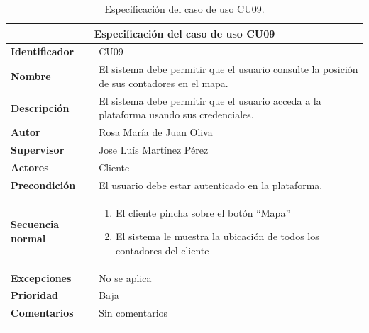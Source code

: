 \documentclass[pdftex,11pt,a4paper]{book}
\begin{document}

\renewcommand{\tablename}{Tabla}
\renewcommand{\arraystretch}{1,7}

\begin{center}
\begin{longtable}{|m{}|m{11cm}|}
\hline
\multicolumn{2}{|c|}{\textbf{Especificación del caso de uso CU09}}\\
\hline 
\endhead

\textbf{Identificador} & CU09 
\\ \hline
\textbf{Nombre} & El sistema debe permitir que el usuario consulte la posición de sus contadores en el mapa.
\\ \hline
\textbf{Descripción} & El sistema debe permitir que el usuario acceda a la plataforma usando sus credenciales.  
\\ \hline
\textbf{Autor} & Rosa María de Juan Oliva 
\\ \hline
\textbf{Supervisor} & Jose Luís Martínez Pérez  
\\ \hline
\textbf{Actores} & Cliente 
\\ \hline
\textbf{Precondición} & El usuario debe estar autenticado en la plataforma.
\\ \hline
\textbf{Secuencia normal} & 
\begin{enumerate}
\addtolength{\itemsep}{-3mm}
\item El cliente pincha sobre el botón “Mapa”
\item El sistema le muestra la ubicación de todos los contadores del cliente
\end{enumerate}
\\ \hline
\textbf{Excepciones} & No se aplica
\\ \hline
\textbf{Prioridad} & Baja  
\\ \hline
\textbf{Comentarios} & Sin comentarios
\\ \hline

\caption{Especificación del caso de uso CU09.} \label{tablalarga:tablaCU09}
\end{longtable}
\end{center}


\renewcommand{\tablename}{Tabla}
\renewcommand{\arraystretch}{1,7}
\end{document}
